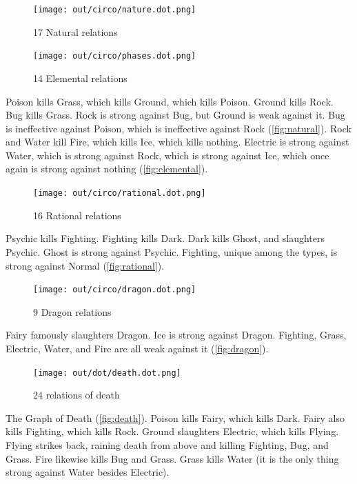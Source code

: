 \begin{figure}[h!]
  \begin{minipage}[t]{0.5\textwidth}
    \texttt{[image: out/circo/nature.dot.png]}
    \caption{17 Natural relations}
    \label{fig:natural}
  \end{minipage}
  \begin{minipage}[t]{0.5\textwidth}
    \texttt{[image: out/circo/phases.dot.png]}
    \caption{14 Elemental relations}
    \label{fig:elemental}
  \end{minipage}
\end{figure}
\noindent{}Poison kills Grass, which kills Ground, which kills Poison.
Ground kills Rock.
Bug kills Grass.
Rock is strong against Bug, but Ground is weak against it.
Bug is ineffective against Poison, which is ineffective against Rock (\autoref{fig:natural}).
Rock and Water kill Fire, which kills Ice, which kills nothing.
Electric is strong against Water, which is strong against Rock, which is strong against Ice,
 which once again is strong against nothing (\autoref{fig:elemental}).

\begin{figure}[ht]
\centering
\texttt{[image: out/circo/rational.dot.png]}
\caption{16 Rational relations}
\label{fig:rational}
\end{figure}
\noindent{}Psychic kills Fighting.
Fighting kills Dark.
Dark kills Ghost, and slaughters Psychic.
Ghost is strong against Psychic.
Fighting, unique among the types, is strong against Normal (\autoref{fig:rational}).
\clearpage

\begin{figure}[t!]
\centering
\texttt{[image: out/circo/dragon.dot.png]}
\caption{9 Dragon relations}
\label{fig:dragon}
\end{figure}
\noindent{}Fairy famously slaughters Dragon.
Ice is strong against Dragon.
Fighting, Grass, Electric, Water, and Fire are all weak against it (\autoref{fig:dragon}).
\vspace{.5in}

\begin{figure}[h!]
\centering
\texttt{[image: out/dot/death.dot.png]}
\caption{24 relations of death}
\label{fig:death}
\end{figure}
\noindent{}The Graph of Death (\autoref{fig:death}).
Poison kills Fairy, which kills Dark.
Fairy also kills Fighting, which kills Rock.
Ground slaughters Electric, which kills Flying.
Flying strikes back, raining death from above and killing Fighting, Bug, and Grass.
Fire likewise kills Bug and Grass.
Grass kills Water (it is the only thing strong against Water besides Electric).
\clearpage

